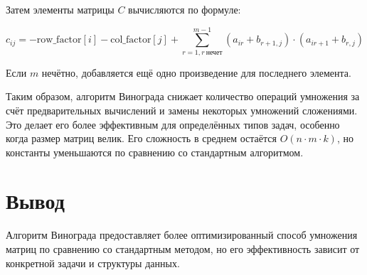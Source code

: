 Затем элементы матрицы \( C \) вычисляются по формуле:

\begin{equation}
    \label{eq:vin3}
    c_{ij} = -\text{row\_factor}[i] - \text{col\_factor}[j] + \sum_{r=1, r\ \text{нечет}}^{m-1} (a_{ir} + b_{r+1,j}) \cdot (a_{ir+1} + b_{r,j})
\end{equation}

Если \( m \) нечётно, добавляется ещё одно произведение для последнего элемента.

Таким образом, алгоритм Винограда снижает количество операций умножения за счёт предварительных вычислений и замены некоторых умножений сложениями. Это делает его более эффективным для определённых типов задач, особенно когда размер матриц велик. Его сложность в среднем остаётся \( O(n \cdot m \cdot k) \), но константы уменьшаются по сравнению со стандартным алгоритмом.\cite{vin}

\section{Вывод}

Алгоритм Винограда предоставляет более оптимизированный способ умножения матриц по сравнению со стандартным методом, но его эффективность зависит от конкретной задачи и структуры данных.

\clearpage